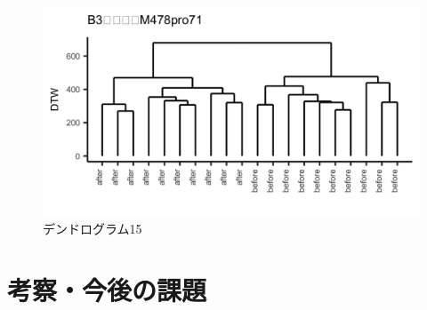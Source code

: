 \documentclass{jarticle}
\begin{document}
\begin{figure}[H]
	\begin{center}
		\includegraphics[width=15cm]{fig/dendro_15.png}
		\caption{デンドログラム15}
		\label{fig:dendro15}

	\end{center}
\end{figure}



\section{考察・今後の課題}






\end{document}
